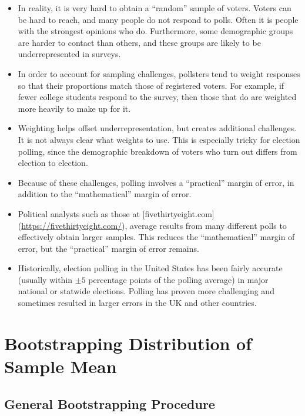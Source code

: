 \documentclass[]{book}
\begin{document}
\begin{itemize}
\item
  In reality, it is very hard to obtain a ``random'' sample of voters.
  Voters can be hard to reach, and many people do not respond to polls.
  Often it is people with the strongest opinions who do. Furthermore,
  some demographic groups are harder to contact than others, and these
  groups are likely to be underrepresented in surveys.
\item
  In order to account for sampling challenges, pollsters tend to weight
  responses so that their proportions match those of registered voters.
  For example, if fewer college students respond to the survey, then
  those that do are weighted more heavily to make up for it.
\item
  Weighting helps offset underrepresentation, but creates additional
  challenges. It is not always clear what weights to use. This is
  especially tricky for election polling, since the demographic
  breakdown of voters who turn out differs from election to election.
\item
  Because of these challenges, polling involves a ``practical'' margin
  of error, in addition to the ``mathematical'' margin of error.
\item
  Political analysts such as those at {[}fivethirtyeight.com{]}
  (\url{https://fivethirtyeight.com/}), average results from many
  different polls to effectively obtain larger samples. This reduces the
  ``mathematical'' margin of error, but the ``practical'' margin of
  error remains.
\item
  Historically, election polling in the United States has been fairly
  accurate (usually within \(\pm 5\) percentage points of the polling
  average) in major national or statwide elections. Polling has proven
  more challenging and sometimes resulted in larger errors in the UK and
  other countries.
\end{itemize}

\section{Bootstrapping Distribution of Sample
Mean}\label{bootstrapping-distribution-of-sample-mean}

\subsection{General Bootstrapping
Procedure}\label{general-bootstrapping-procedure}
\end{document}
